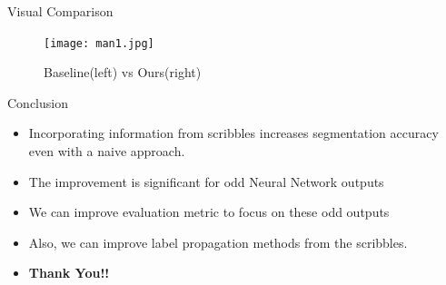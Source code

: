 \documentclass{beamer}
\begin{document}
	\begin{frame}{Visual Comparison}
		\begin{figure}[H]
			\begin{center}
				\texttt{[image: man1.jpg]}
				\caption{Baseline(left) vs Ours(right)}
			\end{center}			
		\end{figure}		
	\end{frame}

	
	\begin{frame}{ Conclusion}
		\begin{itemize}
			\item {
				Incorporating information from scribbles increases segmentation accuracy even with a naive approach. \newline
			}
			\pause			
			\item{
				The improvement is significant for odd Neural Network outputs  \newline
			}
			\pause
			\item{
				 We can improve evaluation metric to focus on these odd outputs \newline
			}
			\pause
			\item{
				Also, we can improve label propagation methods from the scribbles.
			}
		\end{itemize}
	\end{frame}

	
	\begin{frame}{}
		\begin{itemize}
			\item[] \centering \textbf{Thank You!!}
		\end{itemize}
	\end{frame}
	
	
\end{document}
